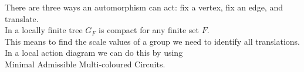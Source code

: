 \documentclass[preview]{standalone}
\begin{document}
There are three ways an automorphism can act: fix a vertex, fix an edge, and translate.\\In a locally finite tree $G_F$ is compact for any finite set $F$.\\This means to find the scale values of a group we need to identify all translations.\phantom{t} \\In a local action diagram we can do this by using \\ Minimal Admissible Multi-coloured Circuits.\\
\end{document}
